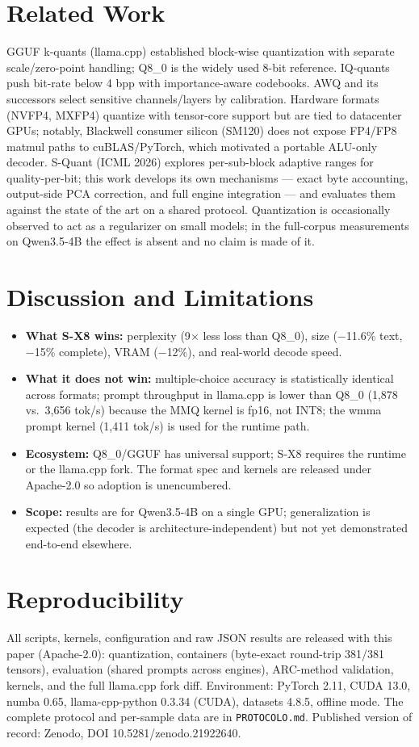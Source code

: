 \documentclass[11pt]{article}
\begin{document}
\section{Related Work}
GGUF k-quants (llama.cpp) established block-wise quantization with separate scale/zero-point handling;
Q8\_0 is the widely used 8-bit reference. IQ-quants push bit-rate below 4 bpp with importance-aware
codebooks. AWQ and its successors select sensitive channels/layers by calibration. Hardware formats
(NVFP4, MXFP4) quantize with tensor-core support but are tied to datacenter GPUs; notably, Blackwell
consumer silicon (SM120) does not expose FP4/FP8 matmul paths to cuBLAS/PyTorch, which motivated a
portable ALU-only decoder. S-Quant (ICML 2026) explores per-sub-block adaptive ranges for quality-per-bit;
this work develops its own mechanisms --- exact byte accounting, output-side PCA correction, and full engine
integration --- and evaluates them against the state of the art on a shared protocol. Quantization is
occasionally observed to act as a regularizer on small
models; in the full-corpus measurements on Qwen3.5-4B the effect is absent and no claim is made of it.

\section{Discussion and Limitations}
\begin{itemize}
\item \textbf{What S-X8 wins:} perplexity (9$\times$ less loss than Q8\_0), size ($-$11.6\% text, $-$15\%
complete), VRAM ($-$12\%), and real-world decode speed.
\item \textbf{What it does not win:} multiple-choice accuracy is statistically identical across formats;
prompt throughput in llama.cpp is lower than Q8\_0 (1,878 vs.\ 3,656 tok/s) because the MMQ kernel is
fp16, not INT8; the wmma prompt kernel (1,411 tok/s) is used for the runtime path.
\item \textbf{Ecosystem:} Q8\_0/GGUF has universal support; S-X8 requires the runtime or the llama.cpp
fork. The format spec and kernels are released under Apache-2.0 so adoption is unencumbered.
\item \textbf{Scope:} results are for Qwen3.5-4B on a single GPU; generalization is expected (the decoder
is architecture-independent) but not yet demonstrated end-to-end elsewhere.
\end{itemize}

\section{Reproducibility}
All scripts, kernels, configuration and raw JSON results are released with this paper (Apache-2.0):
quantization, containers (byte-exact round-trip 381/381 tensors), evaluation (shared prompts across
engines), ARC-method validation, kernels, and the full llama.cpp fork diff. Environment: PyTorch 2.11,
CUDA 13.0, numba 0.65, llama-cpp-python 0.3.34 (CUDA), datasets 4.8.5, offline mode. The complete
protocol and per-sample data are in \texttt{PROTOCOLO.md}. Published version of record: Zenodo, DOI 10.5281/zenodo.21922640.
\end{document}
